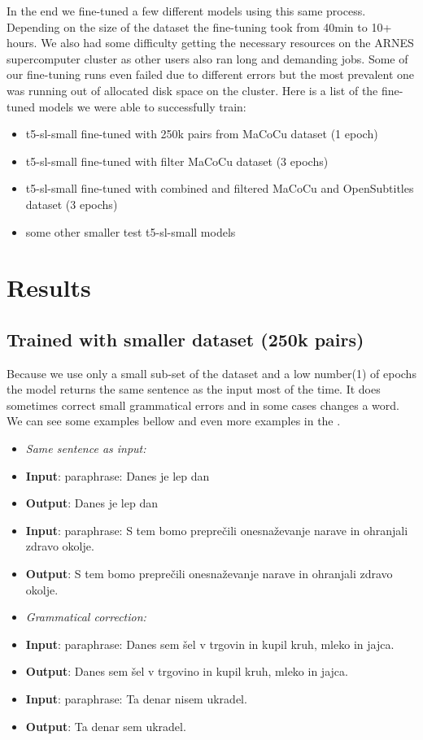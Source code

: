 \documentclass[fleqn,moreauthors,10pt]{ds_report}
\begin{document}
In the end we fine-tuned a few different models using this same process. Depending on the size of the dataset the fine-tuning took from 40min to 10+ hours. We also had some difficulty getting the necessary resources on the ARNES supercomputer cluster as other users also ran long and demanding jobs. Some of our fine-tuning runs even failed due to different errors but the most prevalent one was running out of allocated disk space on the cluster. Here is a list of the fine-tuned models we were able to successfully train: 
\begin{itemize}
    \item t5-sl-small fine-tuned with 250k pairs from MaCoCu dataset (1 epoch)
    \item t5-sl-small fine-tuned with filter MaCoCu dataset (3 epochs)
    \item t5-sl-small fine-tuned with combined and filtered MaCoCu and OpenSubtitles dataset (3 epochs)
    \item some other smaller test t5-sl-small models
\end{itemize}

\section{Results}
\label{sec:results}
\subsection{Trained with smaller dataset (250k pairs)}
Because we use only a small sub-set of the dataset and a low number(1) of epochs the model returns the same sentence as the input most of the time. It does sometimes correct small grammatical errors and in some cases changes a word. We can see some examples bellow and even more examples in the .

\begin{itemize}
\item \emph{Same sentence as input:}
\item \textbf{Input}: paraphrase: Danes je lep dan 
\item \textbf{Output}: Danes je lep dan
\item \textbf{Input}: paraphrase: S tem bomo preprečili onesnaževanje narave in ohranjali zdravo okolje. 
\item \textbf{Output}: S tem bomo preprečili onesnaževanje narave in ohranjali zdravo okolje.
\item \emph{Grammatical correction:}
\item \textbf{Input}: paraphrase: Danes sem šel v trgovin in kupil kruh, mleko in jajca. 
\item \textbf{Output}: Danes sem šel v trgovino in kupil kruh, mleko in jajca.
\item \textbf{Input}: paraphrase: Ta denar nisem ukradel. 
\item \textbf{Output}: Ta denar sem ukradel.
\end{itemize}
\end{document}
